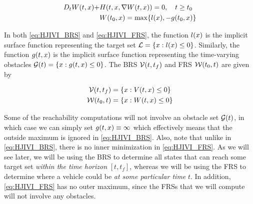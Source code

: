 \begin{equation}
\label{eq:HJIVI_FRS}
\begin{aligned}
D_t \valfuncfwd(t, \state) + &\ham(t, \state, \nabla \valfuncfwd(t, \state)) = 0 , \quad t \ge t_0  \\
&\valfuncfwd(t_0, \state) = \max\{\fc(\state), -\obsfunc(t_0, \state)\}
\end{aligned}
\end{equation}

In both \eqref{eq:HJIVI_BRS} and \eqref{eq:HJIVI_FRS}, the function $l(x)$ is the implicit surface function representing the target set $\mathcal{L} = \{x: l(x) \le 0\}$. Similarly, the function $g(t, x)$ is the implicit surface function representing the time-varying obstacles $\mathcal{G}(t) = \{x: g(t,x)\le 0\}$. The BRS $\mathcal{V}(t, t_f)$ and FRS $\mathcal{W}(t_0, t)$ are given by

\begin{equation}
\label{eq:implicitValfuncs}
\begin{aligned}
\brs(t, t_f) &= \{\state: \valfunc(t, \state) \le 0\} \\
\frs(t_0, t) &= \{\state: \valfuncfwd(t, \state) \le 0 \}
\end{aligned}
\end{equation}

Some of the reachability computations will not involve an obstacle set $\mathcal{G}(t)$, in which case we can simply set $g(t, x) \equiv \infty$ which effectively means that the outside maximum is ignored in \eqref{eq:HJIVI_BRS}. Also, note that unlike in \eqref{eq:HJIVI_BRS}, there is no inner minimization in \eqref{eq:HJIVI_FRS}. As we will see later, we will be using the BRS to determine all states that can reach some target set \textit{within the time horizon} $[t,t_f]$, whereas we will be using the FRS to determine where a vehicle could be \textit{at some particular time} $t$. In addition, \eqref{eq:HJIVI_FRS} has no outer maximum, since the FRSs that we will compute will not involve any obstacles.

%

